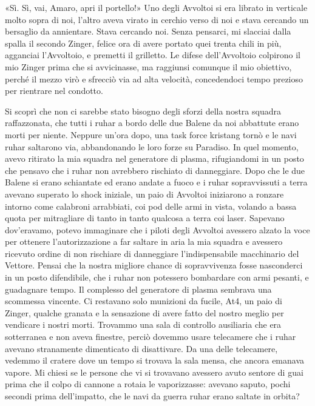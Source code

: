 «Sì. Sì, vai, Amaro, apri il portello!» Uno degli Avvoltoi si era
librato in verticale molto sopra di noi, l'altro aveva virato in cerchio
verso di noi e stava cercando un bersaglio da annientare. Stava cercando
noi. Senza pensarci, mi slacciai dalla spalla il secondo Zinger, felice
ora di avere portato quei trenta chili in più, agganciai l'Avvoltoio, e
premetti il grilletto. Le difese dell'Avvoltoio colpirono il mio Zinger
prima che si avvicinasse, ma raggiunsi comunque il mio obiettivo, perché
il mezzo virò e sfrecciò via ad alta velocità, concedendoci tempo
prezioso per rientrare nel condotto.

\hfill\break

Si scoprì che non ci sarebbe stato bisogno degli sforzi della nostra
squadra raffazzonata, che tutti i ruhar a bordo delle due Balene da noi
abbattute erano morti per niente. Neppure un'ora dopo, una task force
kristang tornò e le navi ruhar saltarono via, abbandonando le loro forze
su Paradiso. In quel momento, avevo ritirato la mia squadra nel
generatore di plasma, rifugiandomi in un posto che pensavo che i ruhar
non avrebbero rischiato di danneggiare. Dopo che le due Balene si erano
schiantate ed erano andate a fuoco e i ruhar sopravvissuti a terra
avevano superato lo shock iniziale, un paio di Avvoltoi iniziarono a
ronzare intorno come calabroni arrabbiati, coi pod delle armi in vista,
volando a bassa quota per mitragliare di tanto in tanto qualcosa a terra
coi laser. Sapevano dov'eravamo, potevo immaginare che i piloti degli
Avvoltoi avessero alzato la voce per ottenere l'autorizzazione a far
saltare in aria la mia squadra e avessero ricevuto ordine di non
rischiare di danneggiare l'indispensabile macchinario del Vettore.
Pensai che la nostra migliore chance di sopravvivenza fosse nasconderci
in un posto difendibile, che i ruhar non potessero bombardare con armi
pesanti, e guadagnare tempo. Il complesso del generatore di plasma
sembrava una scommessa vincente. Ci restavano solo munizioni da fucile,
At4, un paio di Zinger, qualche granata e la sensazione di avere fatto
del nostro meglio per vendicare i nostri morti. Trovammo una sala di
controllo ausiliaria che era sotterranea e non aveva finestre, perciò
dovemmo usare telecamere che i ruhar avevano stranamente dimenticato di
disattivare. Da una delle telecamere, vedemmo il cratere dove un tempo
si trovava la sala mensa, che ancora emanava vapore. Mi chiesi se le
persone che vi si trovavano avessero avuto sentore di guai prima che il
colpo di cannone a rotaia le vaporizzasse: avevano saputo, pochi secondi
prima dell'impatto, che le navi da guerra ruhar erano saltate in orbita?
